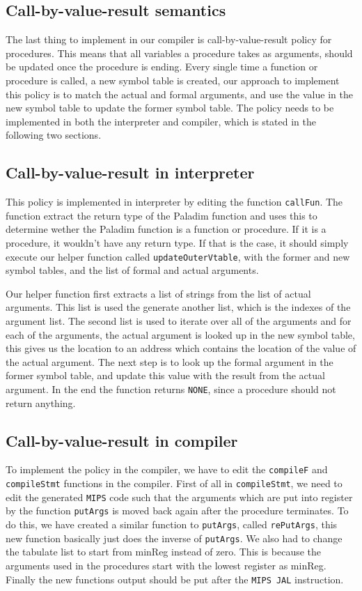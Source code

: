 \documentclass[10pt]{article}
\begin{document}
\subsection{Call-by-value-result semantics}
The last thing to implement in our compiler is call-by-value-result policy for procedures. This means that all variables a procedure takes as arguments, should be updated once the procedure is ending. Every single time a function or procedure is called, a new symbol table is created, our approach to implement this policy is to match the actual and formal arguments, and use the value in the new symbol table to update the former symbol table. The policy needs to be implemented in both the interpreter and compiler, which is stated in the following two sections.

\subsection{Call-by-value-result in interpreter}
This policy is implemented in interpreter by editing the function \texttt{callFun}. The function extract the return type of the Paladim function and uses this to determine wether the Paladim function is a function or procedure. If it is a procedure, it wouldn't have any return type. If that is the case, it should simply execute our helper function called \texttt{updateOuterVtable}, with the former and new symbol tables, and the list of formal and actual arguments.

Our helper function first extracts a list of strings from the list of actual arguments. This list is used the generate another list, which is the indexes of the argument list. The second list is used to iterate over all of the arguments and for each of the arguments, the actual argument is looked up in the new symbol table, this gives us the location to an address which contains the location of the value of the actual argument. The next step is to look up the formal argument in the former symbol table, and update this value with the result from the actual argument. In the end the function returns \texttt{NONE}, since a procedure should not return anything.

\subsection{Call-by-value-result in compiler}
To implement the policy in the compiler, we have to edit the \texttt{compileF} and \texttt{compileStmt} functions in the compiler. First of all in \texttt{compileStmt}, we need to edit the generated \texttt{MIPS} code such that the arguments which are put into register by the function \texttt{putArgs} is moved back again after the procedure terminates. To do this, we have created a similar function to \texttt{putArgs}, called \texttt{rePutArgs}, this new function basically just does the inverse of \texttt{putArgs}. We also had to change the tabulate list to start from minReg instead of zero. This is because the arguments used in the procedures start with the lowest register as minReg. Finally the new functions output should be put after the \texttt{MIPS JAL} instruction.
\end{document}
